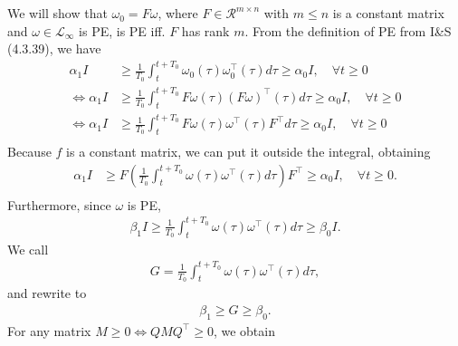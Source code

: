 \documentclass[]{article}
\begin{document}
\section{}
We will show that $\omega_0 = F\omega$, where $F \in \mathcal{R}^{m \times n}$ with $m\leq n$ is a constant matrix and $\omega \in \mathcal{L}_\infty$ is PE, is PE iff. $F$ has rank $m$. From the definition of PE from I\&S (4.3.39), we have
\begin{equation}\begin{aligned}
\alpha_1 I &\geq \frac{1}{T_0} \int^{t+T_0}_{t}\omega_0(\tau) \omega_0^\top(\tau) d\tau \geq \alpha_0 I, \quad \forall t \geq 0 \\
\iff \alpha_1 I &\geq \frac{1}{T_0} \int^{t+T_0}_{t}F\omega(\tau) (F\omega)^\top(\tau) d\tau \geq \alpha_0 I, \quad  \forall t \geq 0 \\
\iff \alpha_1 I &\geq \frac{1}{T_0} \int^{t+T_0}_{t}F\omega(\tau) \omega^\top(\tau)F^\top d\tau \geq \alpha_0 I, \quad  \forall t \geq 0 \\
\end{aligned}\end{equation}
Because $f$ is a constant matrix, we can put it outside the integral, obtaining
\begin{equation}\begin{aligned}
\alpha_1 I &\geq F\left(\frac{1}{T_0} \int^{t+T_0}_{t}\omega(\tau) \omega^\top(\tau) d\tau\right) F^\top \geq \alpha_0 I, \quad  \forall t \geq 0. \\
\end{aligned}\end{equation}
Furthermore, since $\omega$ is PE,
\begin{equation}\begin{aligned}
\beta_1 I\geq \frac{1}{T_0} \int^{t+T_0}_{t}\omega(\tau) \omega^\top(\tau) d\tau \geq \beta_0 I.
\end{aligned}\end{equation}
We call
\begin{equation}\begin{aligned}
G = \frac{1}{T_0} \int^{t+T_0}_{t}\omega(\tau) \omega^\top(\tau) d\tau,
\end{aligned}\end{equation}
and rewrite to
\begin{equation}\begin{aligned}
\beta_1 \geq G \geq \beta_0.
\end{aligned}\end{equation}
For any matrix $M \geq 0 \iff QMQ^\top \geq 0$, we obtain
\end{document}
